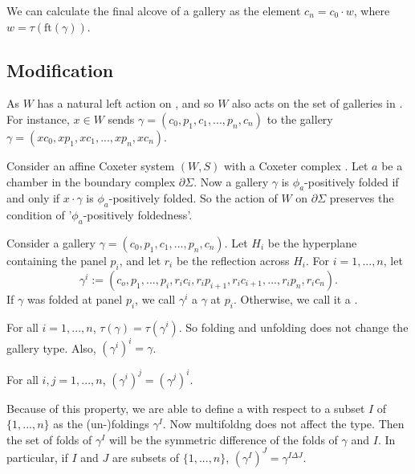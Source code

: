 \documentclass[11pt]{article}
\begin{document}
\begin{lemma}
    We can calculate the final alcove of a gallery as the element $c_n=c_0\cdot w$, where $w=\tau(\text{ft}(\gamma))$.
\end{lemma}

\subsection{Modification}

As $W$ has a natural left action on \sg, and so $W$ also acts on the set of galleries in \sg. For instance, $x\in W$ sends $\gamma = (c_0,p_1,c_1,...,p_n,c_n)$ to the gallery $\gamma = (xc_0,xp_1,xc_1,...,xp_n,xc_n)$. 

\begin{lemma}
    Consider an affine Coxeter system $(W,S)$ with a Coxeter complex \sg. Let $a$ be a chamber in the boundary complex $\partial\Sigma$. Now a gallery $\gamma$ is $\phi_a$-positively folded if and only if $x\cdot \gamma$ is $\phi_a$-positively folded. So the action of $W$ on $\partial\Sigma$ preserves the condition of '$\phi_a$-positively foldedness'.
\end{lemma}

\begin{definition}
    Consider a gallery $\gamma = (c_0,p_1,c_1,...,p_n,c_n)$. Let $H_i$ be the hyperplane containing the panel $p_i$, and let $r_i$ be the reflection across $H_i$. For $i=1,...,n$, let
    \[\gamma^i:=(c_o,p_1,...,p_i,r_ic_i,r_ip_{i+1},r_ic_{i+1},...,r_ip_n,r_ic_n).\]
    If $\gamma$ was folded at panel $p_i$, we call $\gamma^i$ a $\gamma$ at $p_i$. Otherwise, we call it a .
\end{definition}

\begin{lemma}
    For all $i=1,...,n$, $\tau(\gamma)=\tau(\gamma^i)$. So folding and unfolding does not change the gallery type. Also, $(\gamma^i)^i=\gamma$. 
\end{lemma}

\begin{lemma}
    For all $i,j=1,...,n$, $(\gamma^i)^j=(\gamma^j)^i.$
\end{lemma}

Because of this property, we are able to define a  with respect to a subset $I$ of $\{1,...,n\}$ as the (un-)foldings $\gamma^I$. Now multifoldng does not affect the type. Then the set of folds of $\gamma^I$ will be the symmetric difference of the folds of $\gamma$ and $I$. In particular, if $I$ and $J$ are subsets of $\{1,...,n\}$, $(\gamma^I)^J=\gamma^{I\Delta J}$. 
\end{document}
